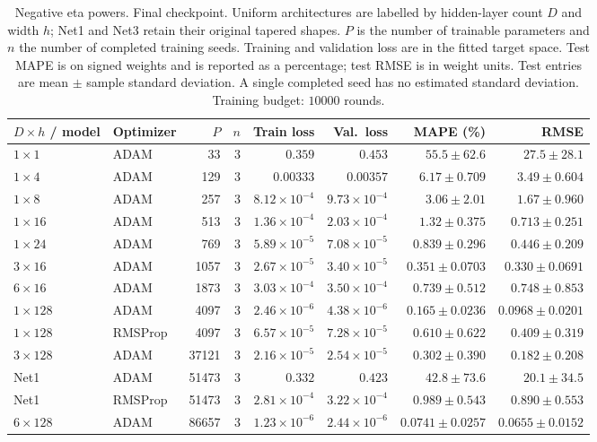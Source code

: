 \begin{table}[!htbp]
\centering
\small
\setlength{\tabcolsep}{4pt}
\renewcommand{\arraystretch}{1.18}
\begin{tabular}{@{}llrrrrrr@{}}
\toprule
$D\times h$ / model & Optimizer & $P$ & $n$ & Train loss & Val.\ loss & MAPE (\%) & RMSE \\
\midrule
$1\times 1$ & ADAM & 33 & 3 & $0.359$ & $0.453$ & $55.5\pm62.6$ & $27.5\pm28.1$ \\
$1\times 4$ & ADAM & 129 & 3 & $0.00333$ & $0.00357$ & $6.17\pm0.709$ & $3.49\pm0.604$ \\
$1\times 8$ & ADAM & 257 & 3 & $8.12\times10^{-4}$ & $9.73\times10^{-4}$ & $3.06\pm2.01$ & $1.67\pm0.960$ \\
$1\times 16$ & ADAM & 513 & 3 & $1.36\times10^{-4}$ & $2.03\times10^{-4}$ & $1.32\pm0.375$ & $0.713\pm0.251$ \\
$1\times 24$ & ADAM & 769 & 3 & $5.89\times10^{-5}$ & $7.08\times10^{-5}$ & $0.839\pm0.296$ & $0.446\pm0.209$ \\
$3\times 16$ & ADAM & 1057 & 3 & $2.67\times10^{-5}$ & $3.40\times10^{-5}$ & $0.351\pm0.0703$ & $0.330\pm0.0691$ \\
$6\times 16$ & ADAM & 1873 & 3 & $3.03\times10^{-4}$ & $3.50\times10^{-4}$ & $0.739\pm0.512$ & $0.748\pm0.853$ \\
$1\times 128$ & ADAM & 4097 & 3 & $2.46\times10^{-6}$ & $4.38\times10^{-6}$ & $0.165\pm0.0236$ & $0.0968\pm0.0201$ \\
$1\times 128$ & RMSProp & 4097 & 3 & $6.57\times10^{-5}$ & $7.28\times10^{-5}$ & $0.610\pm0.622$ & $0.409\pm0.319$ \\
$3\times 128$ & ADAM & 37121 & 3 & $2.16\times10^{-5}$ & $2.54\times10^{-5}$ & $0.302\pm0.390$ & $0.182\pm0.208$ \\
Net1 & ADAM & 51473 & 3 & $0.332$ & $0.423$ & $42.8\pm73.6$ & $20.1\pm34.5$ \\
Net1 & RMSProp & 51473 & 3 & $2.81\times10^{-4}$ & $3.22\times10^{-4}$ & $0.989\pm0.543$ & $0.890\pm0.553$ \\
$6\times 128$ & ADAM & 86657 & 3 & $1.23\times10^{-6}$ & $2.44\times10^{-6}$ & $0.0741\pm0.0257$ & $0.0655\pm0.0152$ \\
\bottomrule
\end{tabular}
\caption{\textsf{Negative eta powers. Final checkpoint. Uniform architectures are labelled by hidden-layer count $D$ and width $h$; Net1 and Net3 retain their original tapered shapes. $P$ is the number of trainable parameters and $n$ the number of completed training seeds. Training and validation loss are in the fitted target space. Test MAPE is on signed weights and is reported as a percentage; test RMSE is in weight units. Test entries are mean $\pm$ sample standard deviation. A single completed seed has no estimated standard deviation. Training budget: $10000$ rounds.}}
\label{tab:depth-eta-negative-final}
\end{table}

